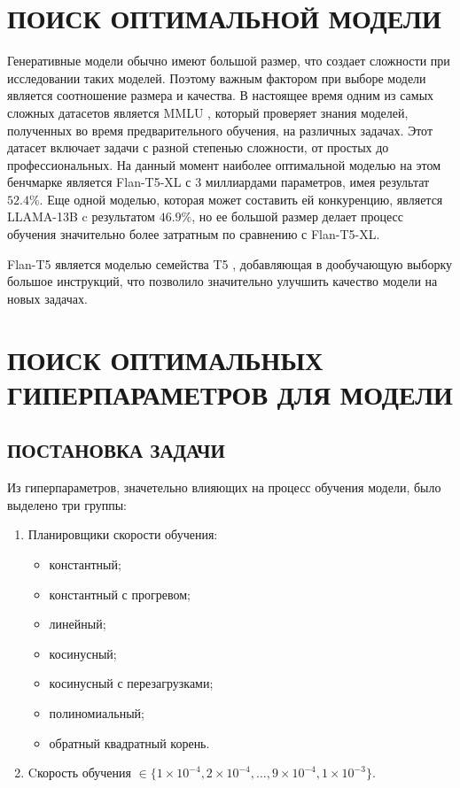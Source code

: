 \section{ПОИСК ОПТИМАЛЬНОЙ МОДЕЛИ}
Генеративные модели обычно имеют большой размер, что создает сложности при исследовании таких моделей. Поэтому важным фактором при выборе модели является соотношение размера и качества. В настоящее время одним из самых сложных датасетов является MMLU \cite{MMLU-bench}, который проверяет знания моделей, полученных во время предварительного обучения, на различных задачах. Этот датасет включает задачи с разной степенью сложности, от простых до профессиональных. На данный момент наиболее оптимальной моделью на этом бенчмарке является Flan-T5-XL \cite{flan-paper} с 3 миллиардами параметров, имея результат $52.4\%$. Еще одной моделью, которая может составить ей конкуренцию, является LLAMA-13B \cite{llama-paper} c результатом $46.9\%$, но ее большой размер делает процесс обучения значительно более затратным по сравнению с Flan-T5-XL.

Flan-T5 является моделью семейства T5 \cite{t5-paper}, добавляющая в дообучающую выборку большое инструкций, что позволило значительно улучшить качество модели на новых задачах.

\section{ПОИСК ОПТИМАЛЬНЫХ ГИПЕРПАРАМЕТРОВ ДЛЯ МОДЕЛИ}
\subsection{ПОСТАНОВКА ЗАДАЧИ}

Из гиперпараметров, значетельно влияющих на процесс обучения модели, было выделено три группы:
\begin{enumerate}
  \item Планировщики скорости обучения:
        \begin{itemize}
          \item константный;
          \item константный с прогревом;
          \item линейный;
          \item косинусный;
          \item косинусный с перезагрузками;
          \item полиномиальный;
          \item обратный квадратный корень.
        \end{itemize}
  \item Cкорость обучения $\in \{1 \times 10^{-4}, 2 \times 10^{-4}, \ldots, 9 \times 10^{-4}, 1 \times 10^{-3}\}$.
\end{enumerate}

